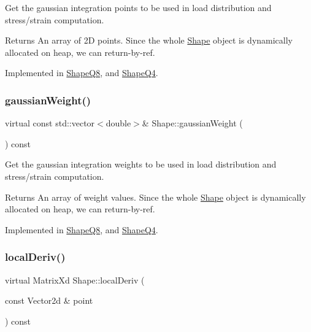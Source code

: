 Get the gaussian integration points to be used in load distribution and stress/strain computation. 

\begin{DoxyReturn}{Returns}
An array of 2D points. Since the whole \mbox{\hyperlink{class_shape}{Shape}} object is dynamically allocated on heap, we can return-\/by-\/ref. 
\end{DoxyReturn}


Implemented in \mbox{\hyperlink{class_shape_q8_a197f1e2109c7ee6c29d27198c96928a4}{Shape\+Q8}}, and \mbox{\hyperlink{class_shape_q4_a5c185036352eabf489007b92f6d48ad2}{Shape\+Q4}}.

\mbox{\label{class_shape_a4257697bb443af2871a7cc7a82c8c823}} 
\subsubsection{\texorpdfstring{gaussian\+Weight()}{gaussianWeight()}}
{\footnotesize\ttfamily virtual const std\+::vector$<$double$>$\& Shape\+::gaussian\+Weight (\begin{DoxyParamCaption}{ }\end{DoxyParamCaption}) const\hspace{0.3cm}{\ttfamily [pure virtual]}}



Get the gaussian integration weights to be used in load distribution and stress/strain computation. 

\begin{DoxyReturn}{Returns}
An array of weight values. Since the whole \mbox{\hyperlink{class_shape}{Shape}} object is dynamically allocated on heap, we can return-\/by-\/ref. 
\end{DoxyReturn}


Implemented in \mbox{\hyperlink{class_shape_q8_a30891417d7ba6d6457b8b5567add07f5}{Shape\+Q8}}, and \mbox{\hyperlink{class_shape_q4_a51233dd1caaabbe8404c06b5b0db5755}{Shape\+Q4}}.

\mbox{\label{class_shape_a55575394f656e3ee4b5ac37ea04af8c9}} 
\subsubsection{\texorpdfstring{local\+Deriv()}{localDeriv()}}
{\footnotesize\ttfamily virtual Matrix\+Xd Shape\+::local\+Deriv (\begin{DoxyParamCaption}\item[{const Vector2d \&}]{point }\end{DoxyParamCaption}) const\hspace{0.3cm}{\ttfamily [pure virtual]}}



